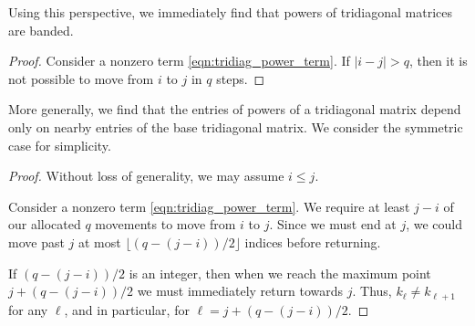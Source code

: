 Using this perspective, we immediately find that powers of tridiagonal matrices are banded.

\begin{proof}
    Consider a nonzero term \cref{eqn:tridiag_power_term}.
    If \( |i-j|>q \), then it is not possible to move from \( i \) to \( j \) in \( q \) steps.
\end{proof}


More generally, we find that the entries of powers of a tridiagonal matrix depend only on nearby entries of the base tridiagonal matrix.
We consider the symmetric case for simplicity.

\begin{proof}
    Without loss of generality, we may assume \( i\leq j \).

    Consider a nonzero term \cref{eqn:tridiag_power_term}.
    We require at least \( j-i \) of our allocated \( q \) movements to move from \( i \) to \( j \).
    Since we must end at \( j \), we could move past \( j \) at most \( \lfloor (q-(j-i))/2 \rfloor \) indices before returning.

    If \( (q-(j-i))/2 \) is an integer, then when we reach the maximum point \( j+(q-(j-i))/2 \) we must immediately return towards \( j \). 
    Thus, \( k_\ell \neq k_{\ell+1} \) for any \( \ell \), and in particular, for \( \ell = j+(q-(j-i))/2 \).
\end{proof}


